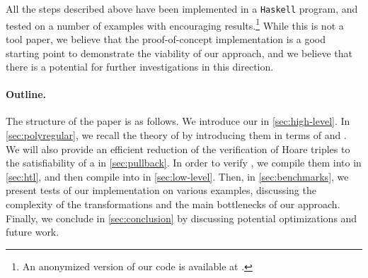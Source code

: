 All the steps described above have been implemented in a \texttt{Haskell}
program, and tested on a number of examples with encouraging
results.\footnote{An anonymized version of our code is available at
\repositoryUrl.} While this is not a tool paper, we believe that the
proof-of-concept implementation is a good starting point to demonstrate the viability of
our approach, and we believe that there is a potential for further
investigations in this direction.


\paragraph{Outline.} The structure of the paper is as follows. We introduce our
 in \cref{sec:high-level}. In \cref{sec:polyregular},
we recall the theory of  by introducing them in terms
of  and . We will also
provide an efficient reduction of the verification of Hoare triples to the
satisfiability of a  in \cref{sec:pullback}.
In order to verify , we compile them into  in \cref{sec:htl}, and then compile  into
 in \cref{sec:low-level}. 
%
Then, in \cref{sec:benchmarks}, we present
tests of our implementation on various examples, discussing
the complexity of the transformations and the main bottlenecks of our approach.
Finally, we conclude in \cref{sec:conclusion} by discussing potential
optimizations and future work.

